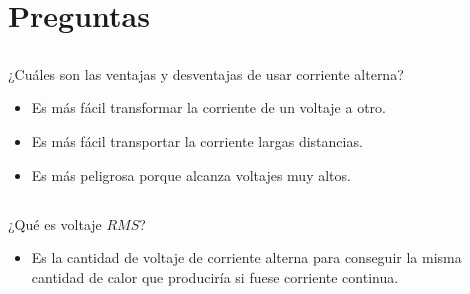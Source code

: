\documentclass[../main.tex]{subfiles}
\begin{document}
\section{Preguntas}%

\thispagestyle{fancy}

\subsection{}%

¿Cuáles son las ventajas y desventajas de usar corriente alterna?
\begin{itemize}
	\item Es más fácil transformar la corriente de un voltaje a otro.
	\item Es más fácil transportar la corriente largas distancias.
	\item Es más peligrosa porque alcanza voltajes muy altos.
\end{itemize}

\subsection{}%

¿Qué es voltaje $RMS$?
\begin{itemize}
	\item Es la cantidad de voltaje de corriente alterna para conseguir la
		misma cantidad de calor que produciría si fuese corriente continua.
\end{itemize}
\end{document}
